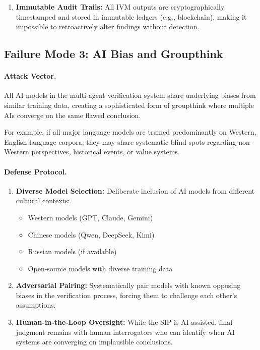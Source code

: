 \documentclass[11pt,a4paper]{article}
\begin{document}
\begin{small}
\begin{enumerate}
    \item \textbf{Immutable Audit Trails:} All IVM outputs are cryptographically timestamped and stored in immutable ledgers (e.g., blockchain), making it impossible to retroactively alter findings without detection.
\end{enumerate}

\subsection{Failure Mode 3: AI Bias and Groupthink}

\paragraph{Attack Vector.} All AI models in the multi-agent verification system share underlying biases from similar training data, creating a sophisticated form of groupthink where multiple AIs converge on the same flawed conclusion.

For example, if all major language models are trained predominantly on Western, English-language corpora, they may share systematic blind spots regarding non-Western perspectives, historical events, or value systems.

\paragraph{Defense Protocol.}

\begin{enumerate}
    \item \textbf{Diverse Model Selection:} Deliberate inclusion of AI models from different cultural contexts:
    \begin{itemize}
        \item Western models (GPT, Claude, Gemini)
        \item Chinese models (Qwen, DeepSeek, Kimi)
        \item Russian models (if available)
        \item Open-source models with diverse training data
    \end{itemize}
    
    \item \textbf{Adversarial Pairing:} Systematically pair models with known opposing biases in the verification process, forcing them to challenge each other's assumptions.
    
    \item \textbf{Human-in-the-Loop Oversight:} While the SIP is AI-assisted, final judgment remains with human interrogators who can identify when AI systems are converging on implausible conclusions.
    

\end{enumerate}
\end{small}
\end{document}
